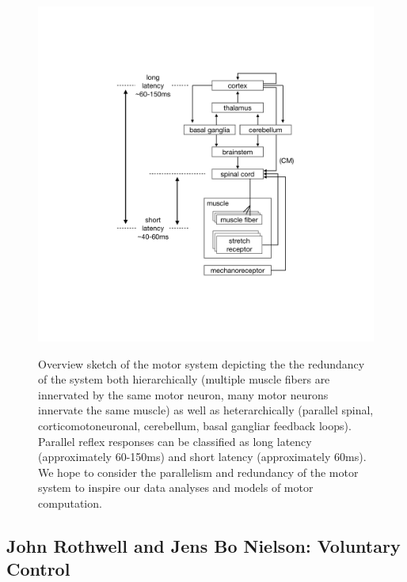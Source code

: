 \documentclass[../main.tex]{subfiles}
\begin{document}
{{{\begin{figure}
\label{fig:motor_system}
\centering
\includegraphics[width=1\textwidth,height=\textheight]{images/physiology/motor_system/motor_system.pdf}
\caption{Overview sketch of the motor system depicting the the
redundancy of the system both hierarchically (multiple muscle fibers are
innervated by the same motor neuron, many motor neurons innervate the
same muscle) as well as heterarchically (parallel spinal,
corticomotoneuronal, cerebellum, basal gangliar feedback loops).
Parallel reflex responses can be classified as long latency
(approximately 60-150ms) and short latency (approximately 60ms). We hope
to consider the parallelism and redundancy of the motor system to
inspire our data analyses and models of motor
computation.}\label{fig:motor_system}
\end{figure}

\subsection{John Rothwell and Jens Bo Nielson: Voluntary
Control}\label{john-rothwell-and-jens-bo-nielson-voluntary-control}

}}}
\end{document}
